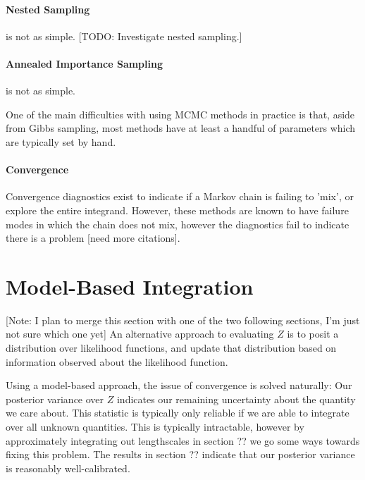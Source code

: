 \documentclass{article}
\begin{document}
\paragraph*{Nested Sampling} is not as simple. [TODO: Investigate nested sampling.] \cite{skilling2004nested}

\paragraph*{Annealed Importance Sampling} is not as simple.

\citep{neal2001annealed}

One of the main difficulties with using MCMC methods in practice is that, aside from Gibbs sampling, most methods have at least a handful of parameters which are typically set by hand.

\paragraph{Convergence}
Convergence diagnostics exist to indicate if a Markov chain is failing to 'mix', or explore the entire integrand.  However, these methods are known to have failure modes in which the chain does not mix, however the diagnostics fail to indicate there is a problem \citep{NealMC} [need more citations].

\section{Model-Based Integration}

[Note: I plan to merge this section with one of the two following sections, I'm just not sure which one yet] An alternative approach to evaluating $Z$ is to posit a distribution over likelihood functions, and update that distribution based on information observed about the likelihood function.


Using a model-based approach, the issue of convergence is solved naturally:  Our posterior variance over $Z$ indicates our remaining uncertainty about the quantity we care about.  This statistic is typically only reliable if we are able to integrate over all unknown quantities.  This is typically intractable, however by approximately integrating out lengthscales in section ?? we go some ways towards fixing this problem.  The results in section ?? indicate that our posterior variance is reasonably well-calibrated.
\end{document}
